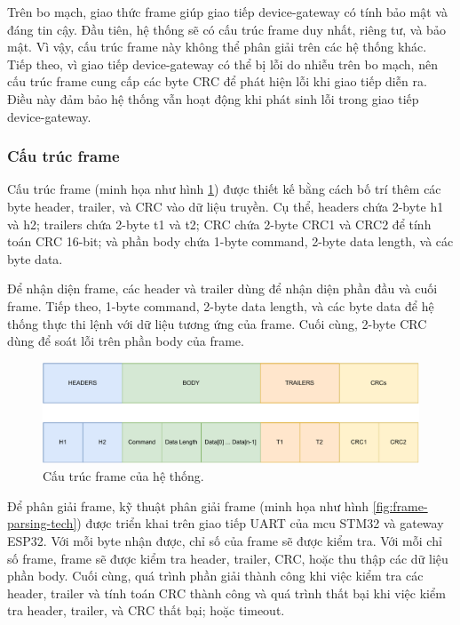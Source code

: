Trên bo mạch, giao thức frame giúp giao tiếp device-gateway có tính bảo mật và đáng tin cậy. Đầu tiên, hệ thống sẽ có cấu trúc frame duy nhất, riêng tư, và bảo mật. Vì vậy, cấu trúc frame này không thể phân giải trên các hệ thống khác. Tiếp theo, vì giao tiếp device-gateway có thể bị lỗi do nhiễu trên bo mạch, nên cấu trúc frame cung cấp các byte CRC để phát hiện lỗi khi giao tiếp diễn ra. Điều này đảm bảo hệ thống vẫn hoạt động khi phát sinh lỗi trong giao tiếp device-gateway.

\subsubsection{Cấu trúc frame}

Cấu trúc frame (minh họa như hình \ref{fig:Frame-Structure-Overview}) được thiết kế bằng cách bố trí thêm các byte header, trailer, và CRC vào dữ liệu truyền. Cụ thể, headers chứa 2-byte h1 và h2; trailers chứa 2-byte t1 và t2; CRC chứa 2-byte CRC1 và CRC2 để tính toán CRC 16-bit; và phần body chứa 1-byte command, 2-byte data length, và các byte data.

Để nhận diện frame, các header và trailer dùng để nhận diện phần đầu và cuối frame. Tiếp theo, 1-byte command, 2-byte data length, và các byte data để hệ thống thực thi lệnh với dữ liệu tương ứng của frame. Cuối cùng, 2-byte CRC dùng để soát lỗi trên phần body của frame.

\begin{figure}[htp]
\centering
\includegraphics[width=0.9\linewidth]{images/Thesis-Page-4-Frame-Structure-Overview.pdf}
\caption{Cấu trúc frame của hệ thống.}
\label{fig:Frame-Structure-Overview}
\end{figure}


Để phân giải frame, kỹ thuật phân giải frame (minh họa như hình \ref{fig:frame-parsing-tech}) được triển khai trên giao tiếp UART của \acrshort{mcu} STM32 và gateway ESP32. Với mỗi byte nhận được, chỉ số của frame sẽ được kiểm tra. Với mỗi chỉ số frame, frame sẽ được kiểm tra header, trailer, CRC, hoặc thu thập các dữ liệu phần body. Cuối cùng, quá trình phần giải thành công khi việc kiểm tra các header, trailer và tính toán CRC thành công và quá trình thất bại khi việc kiểm tra header, trailer, và CRC thất bại; hoặc timeout.


